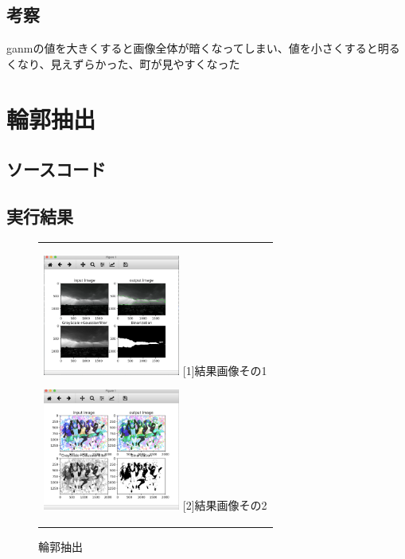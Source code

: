 \documentclass[a4paper,11pt,titlepage]{bxjsarticle}
\begin{document}
\subsection{考察}
ganmの値を大きくすると画像全体が暗くなってしまい、値を小さくすると明るくなり、見えずらかった、町が見やすくなった

\section{輪郭抽出}
\subsection{ソースコード}

\subsection{実行結果}
\begin{figure}[htbp]
  \begin{center}
    \begin{tabular}{c}
      \begin{minipage}{0.33\hsize}
        \begin{center}
          \includegraphics[clip, width=4.5cm]{./output1.png}
          \hspace{1.6cm} [1]結果画像その1
        \end{center}
      \end{minipage}

      \begin{minipage}{0.33\hsize}
        \begin{center}
          \includegraphics[clip, width=4.5cm]{./output2.png}
          \hspace{1.6cm} [2]結果画像その2
        \end{center}
        
      \end{minipage}
       \end{tabular}
    \caption{輪郭抽出}
    \label{fig:lena}
  \end{center}
\end{figure}

\begin{thebibliography}{99}
\end{thebibliography}
\end{document}
